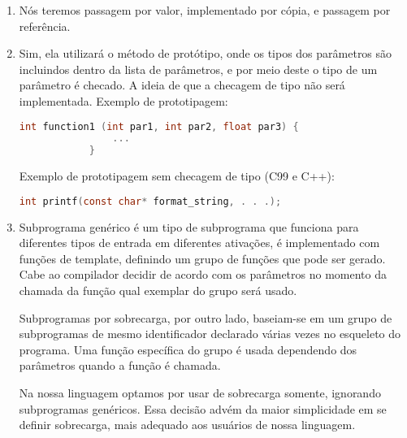 \documentclass[12pt, a4paper]{article}
\begin{document}
\begin{enumerate}
        \item
        Nós teremos passagem por valor, implementado por cópia, e passagem por referência.

        \item
        Sim, ela utilizará o método de protótipo, onde os tipos dos parâmetros são incluindos dentro da lista de parâmetros, e por meio deste o tipo de um parâmetro é checado. A ideia de que a checagem de tipo não será implementada.
        Exemplo de prototipagem:
        \begin{lstlisting}[language=C]
            int function1 (int par1, int par2, float par3) {
            	...
            }
        \end{lstlisting}
        Exemplo de prototipagem sem checagem de tipo (C99 e C++):
        \begin{lstlisting}[language=C]
        	int printf(const char* format_string, . . .);
        \end{lstlisting}

        \item
        Subprograma genérico é um tipo de subprograma que funciona para diferentes tipos de entrada em diferentes ativações, é implementado com funções de template,  definindo um grupo de funções que pode ser gerado. Cabe ao compilador decidir de acordo com os parâmetros no momento da chamada da função qual exemplar do grupo será usado.
        
        Subprogramas por sobrecarga, por outro lado, baseiam-se em um grupo de subprogramas de mesmo identificador declarado várias vezes no esqueleto do programa. Uma função específica do grupo é usada dependendo dos parâmetros quando a função é chamada.
        
        Na nossa linguagem optamos por usar de sobrecarga somente, ignorando subprogramas genéricos. Essa decisão advém da maior simplicidade em se definir sobrecarga, mais adequado aos usuários de nossa linguagem.

        \begin{comment}
            Com sobrecarga:
            int soma(int a, int b) {
                return a+b;
            }

            float soma(float a, float b) {
                return a+b;
            }

            int soma(String a, String b) {
                return a^b;
            }

            Final das contas, posso lembrar o nome de apenas uma função e fazer:


\end{comment}
\end{enumerate}
\end{document}
